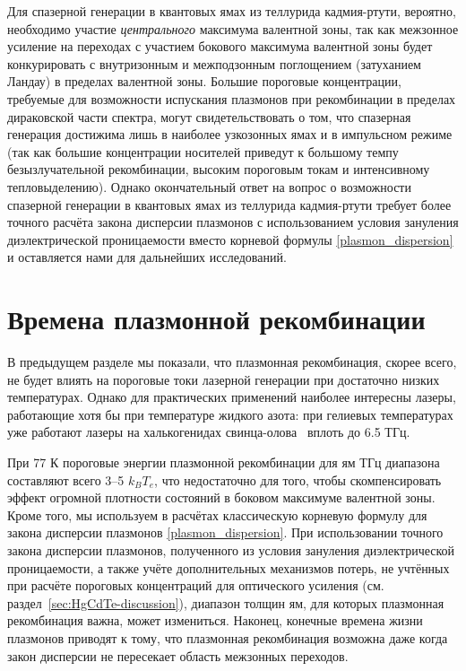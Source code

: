Для спазерной генерации в квантовых ямах из теллурида кадмия-ртути, вероятно, необходимо участие \emph{центрального} максимума валентной зоны, так как межзонное усиление на переходах с участием бокового максимума валентной зоны будет конкурировать с внутризонным и межподзонным поглощением (затуханием Ландау) в пределах валентной зоны. Большие пороговые концентрации, требуемые для возможности испускания плазмонов при рекомбинации в пределах дираковской части спектра, могут свидетельствовать о том, что спазерная генерация достижима лишь в наиболее узкозонных ямах и в импульсном режиме (так как большие концентрации носителей приведут к большому темпу безызлучательной рекомбинации, высоким пороговым токам и интенсивному тепловыделению). Однако окончательный ответ на вопрос о возможности спазерной генерации в квантовых ямах из теллурида кадмия-ртути требует более точного расчёта закона дисперсии плазмонов с использованием условия зануления диэлектрической проницаемости вместо корневой формулы \eqref{plasmon_dispersion} и оставляется нами для дальнейших исследований.

\section{Времена плазмонной рекомбинации} \label{sec:plasmon-recombination_times}
В предыдущем разделе мы показали, что плазмонная рекомбинация, скорее всего, не будет влиять на пороговые токи лазерной генерации при достаточно низких температурах. Однако для практических применений наиболее интересны лазеры, работающие хотя бы при температуре жидкого азота: при гелиевых температурах уже работают лазеры на халькогенидах свинца-олова~\cite{lead_salt_record_wavelength} вплоть до 6.5 ТГц.

При 77 К пороговые энергии плазмонной рекомбинации для ям ТГц диапазона составляют всего 3--5 $k_B T_e$, что недостаточно для того, чтобы скомпенсировать эффект огромной плотности состояний в боковом максимуме валентной зоны. Кроме того, мы используем в расчётах классическую корневую формулу для закона дисперсии плазмонов \eqref{plasmon_dispersion}. При использовании точного закона дисперсии плазмонов, полученного из условия зануления диэлектрической проницаемости, а также учёте дополнительных механизмов потерь, не учтённых при расчёте пороговых концентраций для оптического усиления (см. раздел~\ref{sec:HgCdTe-discussion}), диапазон толщин ям, для которых плазмонная рекомбинация важна, может измениться. Наконец, конечные времена жизни плазмонов приводят к тому, что плазмонная рекомбинация возможна даже когда закон дисперсии не пересекает область межзонных переходов.

